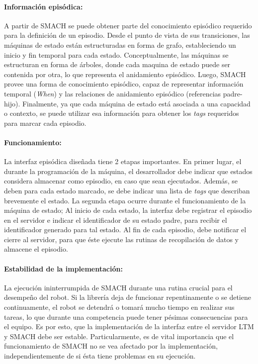 \paragraph{Información episódica:}
A partir de SMACH se puede obtener parte del conocimiento episódico requerido para la definición de un episodio. Desde el punto de vista de sus transiciones, las máquinas de estado están estructuradas en forma de grafo, estableciendo un inicio y fin temporal para cada estado. Conceptualmente, las máquinas se estructuran en forma de árboles, donde cada maquina de estado puede ser contenida por otra, lo que representa el anidamiento episódico. Luego, SMACH provee una forma de conocimiento episódico, capaz de representar información temporal (\textit{When}) y las relaciones de anidamiento episódico (referencias padre-hijo). Finalmente, ya que cada máquina de estado está asociada a una capacidad o contexto, se puede utilizar esa información para obtener los \textit{tags} requeridos para marcar cada episodio.

\paragraph{Funcionamiento:}
La interfaz episódica diseñada tiene 2 etapas importantes. En primer lugar, el durante la programación de la máquina, el desarrollador debe indicar que estados considera almacenar como episodio, en caso que sean ejecutados. Además, se deben para cada estado marcado, se debe indicar una lista de \textit{tags} que describan brevemente el estado. La segunda etapa ocurre durante el funcionamiento de la máquina de estado; Al inicio de cada estado, la interfaz debe registrar el episodio en el servidor e indicar el identificador de su estado padre, para recibir el identificador generado para tal estado. Al fin de cada episodio, debe notificar el cierre al servidor, para que éste ejecute las rutinas de recopilación de datos y almacene el episodio.


\paragraph{Estabilidad de la implementación:}
La ejecución ininterrumpida de SMACH durante una rutina crucial para el desempeño del robot. Si la librería deja de funcionar repentinamente o se detiene continuamente, el robot se detendrá o tomará mucho tiempo en realizar sus tareas, lo que durante una competencia puede tener pésimas consecuencias para el equipo. Es por esto, que la implementación de la interfaz entre el servidor LTM y SMACH debe ser estable. Particularmente, es de vital importancia que el funcionamiento de SMACH no se vea afectado por la implementación, independientemente de si ésta tiene problemas en su ejecución. 


